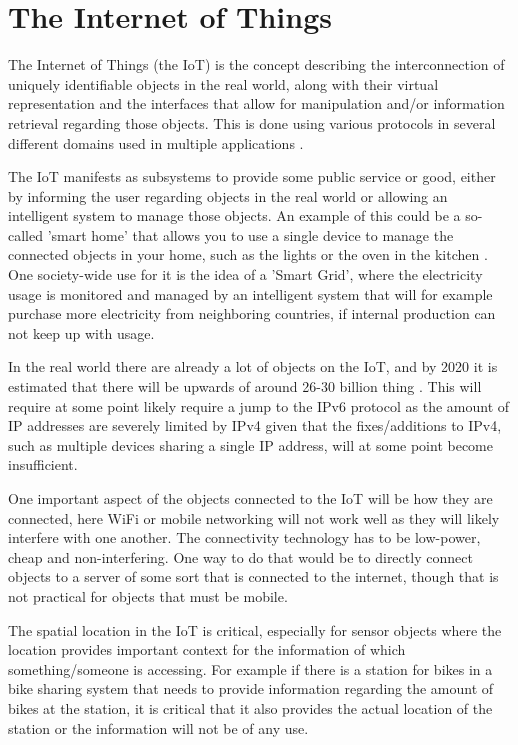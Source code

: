 \section{The Internet of Things}
The Internet of Things (the IoT) is the concept describing the interconnection of uniquely identifiable objects in the real world, along with their virtual representation and the interfaces that allow for manipulation and/or information retrieval regarding those objects.
This is done using various protocols in several different domains used in multiple applications \citep{misc:InternetOfThingsDefinition} \citep{misc:InternetOfThingsDefinition2} \citep{misc:InternetOfThingsDefinition3}.

The IoT manifests as subsystems to provide some public service or good, either by informing the user regarding objects in the real world or allowing an intelligent system to manage those objects.
An example of this could be a so-called 'smart home' that allows you to use a single device to manage the connected objects in your home, such as the lights or the oven in the kitchen \citep{misc:InternetOfThingsExamples}.
One society-wide use for it is the idea of a 'Smart Grid', where the electricity usage is monitored and managed by an intelligent system that will for example purchase more electricity from neighboring countries, if internal production can not keep up with usage.

In the real world there are already a lot of objects on the IoT, and by 2020 it is estimated that there will be upwards of around 26-30 billion thing \citep{misc:IoTGrowth1}\citep{misc:IoTGrowth2}.
This will require at some point likely require a jump to the IPv6 protocol as the amount of IP addresses are severely limited by IPv4\citep{misc:numberOfAddresses} given that the fixes/additions to IPv4, such as multiple devices sharing a single IP address, will at some point become insufficient.

One important aspect of the objects connected to the IoT will be how they are connected, here WiFi or mobile networking will not work well as they will likely interfere with one another.
The connectivity technology has to be low-power, cheap and non-interfering.
One way to do that would be to directly connect objects to a server of some sort that is connected to the internet, though that is not practical for objects that must be mobile. 

The spatial location in the IoT is critical, especially for sensor objects where the location provides important context for the information of which something/someone is accessing.
For example if there is a station for bikes in a bike sharing system that needs to provide information regarding the amount of bikes at the station, it is critical that it also provides the actual location of the station or the information will not be of any use.
